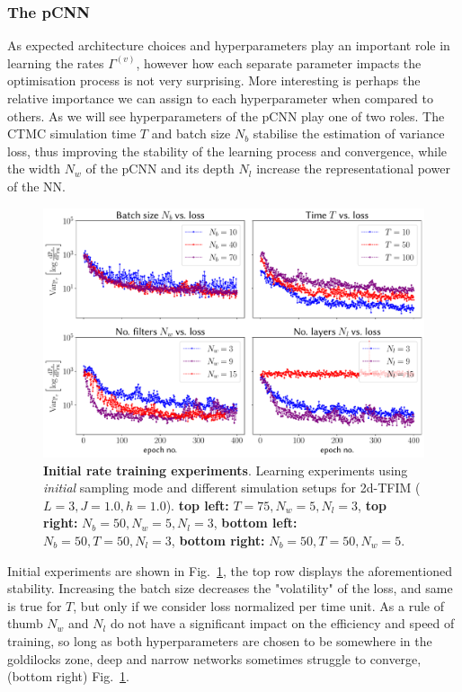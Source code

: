 \subsubsection{The pCNN}
As expected architecture choices and hyperparameters play an important role in learning the rates $\Gamma^{(v)}$, however how each separate parameter impacts the optimisation process is not very surprising. More interesting is perhaps the relative importance we can assign to each hyperparameter when compared to others. As we will see hyperparameters of the pCNN play one of two roles. The CTMC simulation time $T$ and batch size $N_b$ stabilise the estimation of variance loss, thus improving the stability of the learning process and convergence, while the width $N_w$ of the pCNN and its depth $N_l$ increase the representational power of the NN.
\begin{figure}[H]
	\centering
	\includegraphics[width=\linewidth]{Chapter5/Figs/Vector/init_test_learning}
	\caption[Initial rate training experiments]{\textbf{Initial rate training experiments}. Learning experiments using \emph{initial} sampling mode and different simulation setups for 2d-TFIM ($L=3, J=1.0, h=1.0$). \textbf{top left:} $T = 75, N_w = 5, N_l = 3$, \textbf{top right:} $N_b = 50, N_w = 5, N_l = 3$, \textbf{bottom left:} $N_b = 50, T = 50, N_l = 3$, \textbf{bottom right:} $N_b = 50, T = 50, N_w = 5$.}
	\label{fig:inittestlearning}
\end{figure}
Initial experiments are shown in Fig.~\ref{fig:inittestlearning}, the top row displays the aforementioned stability. Increasing the batch size decreases the "volatility" of the loss, and same is true for $T$, but only if we consider loss normalized per time unit. As a rule of thumb $N_w$ and $N_l$ do not have a significant impact on the efficiency and speed of training, so long as both hyperparameters are chosen to be somewhere in the goldilocks zone, deep and narrow networks sometimes struggle to converge, (bottom right) Fig.~\ref{fig:inittestlearning}.

